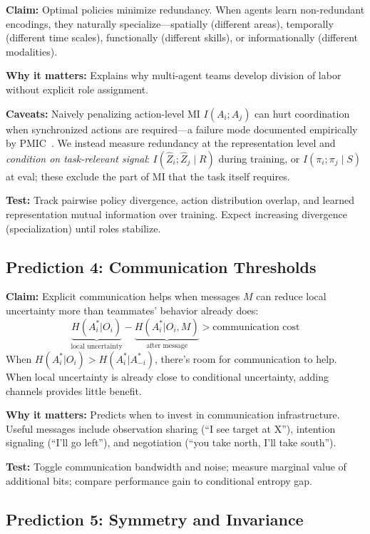 \documentclass[10pt, letterpaper]{article}
\begin{document}
\textbf{Claim:} Optimal policies minimize redundancy. When agents learn non-redundant encodings, they naturally specialize---spatially (different areas), temporally (different time scales), functionally (different skills), or informationally (different modalities).

\textbf{Why it matters:} Explains why multi-agent teams develop division of labor without explicit role assignment.

\textbf{Caveats:} Naively penalizing action-level MI $I(A_i; A_j)$ can hurt coordination when synchronized actions are required---a failure mode documented empirically by PMIC~\cite{li2022pmic}. We instead measure redundancy at the representation level and \emph{condition on task-relevant signal}: $I(\hat{Z}_i; \hat{Z}_j \mid R)$ during training, or $I(\pi_i; \pi_j \mid S)$ at eval; these exclude the part of MI that the task itself requires.

\textbf{Test:} Track pairwise policy divergence, action distribution overlap, and learned representation mutual information over training. Expect increasing divergence (specialization) until roles stabilize.

\subsection{Prediction 4: Communication Thresholds}
\label{pred:communication}

\textbf{Claim:} Explicit communication helps when messages $M$ can reduce local uncertainty more than teammates' behavior already does:
\[\underbrace{H(A_i^* | O_i)}_{\text{local uncertainty}} - \underbrace{H(A_i^* | O_i, M)}_{\text{after message}} > \text{communication cost}\]
When $H(A_i^*|O_i) > H(A_i^*|A_{-i}^*)$, there's room for communication to help. When local uncertainty is already close to conditional uncertainty, adding channels provides little benefit.

\textbf{Why it matters:} Predicts when to invest in communication infrastructure. Useful messages include observation sharing (``I see target at X''), intention signaling (``I'll go left''), and negotiation (``you take north, I'll take south'').

\textbf{Test:} Toggle communication bandwidth and noise; measure marginal value of additional bits; compare performance gain to conditional entropy gap.

\subsection{Prediction 5: Symmetry and Invariance}
\label{pred:symmetry}
\end{document}
